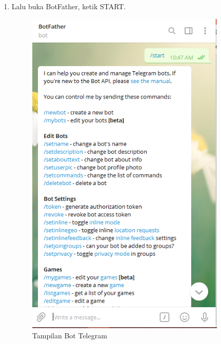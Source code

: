 \begin{enumerate}
\begin{enumerate}
    \\
    \\
    \item  Lalu buka BotFather, ketik START.
     \begin{figure}[H]
    \centering
    \includegraphics[width=0.9\textwidth]{figures/bot2.png}
    \caption{Tampilan Bot Telegram}
    \label{print}
    \end{figure}
    

\end{enumerate}
\end{enumerate}
